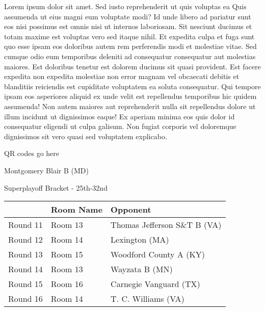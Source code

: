 \documentclass{article}%
\begin{document}
\vspace*{8pt}%
\linebreak%
\newline%
\newline%
    Lorem ipsum dolor sit amet. Sed iusto reprehenderit ut quis voluptas ea Quis assumenda ut eius magni eum voluptate modi? Id unde libero ad pariatur sunt eos nisi possimus est omnis nisi ut internos laboriosam. Sit nesciunt ducimus et totam maxime est voluptas vero sed itaque nihil. Et expedita culpa et fuga sunt quo esse ipsam eos doloribus autem rem perferendis modi et molestiae vitae.\newline%
\newline%
    Sed cumque odio eum temporibus deleniti ad consequatur consequatur aut molestias maiores. Est doloribus tenetur est dolorem ducimus sit quasi provident. Est facere expedita non expedita molestiae non error magnam vel obcaecati debitis et blanditiis reiciendis est cupiditate voluptatem ea soluta consequatur. Qui tempore ipsam eos asperiores aliquid ex unde velit est repellendus temporibus hic quidem assumenda!\newline%
\newline%
    Non autem maiores aut reprehenderit nulla sit repellendus dolore ut illum incidunt ut dignissimos eaque! Ex aperiam minima eos quis dolor id consequatur eligendi ut culpa galisum. Non fugiat corporis vel doloremque dignissimos sit vero quasi sed voluptatem explicabo.\newline%
\newline%
\vspace*{30pt}%
\begin{center}%
\begin{Huge}%
QR codes go here%
\end{Huge}%
\end{center}%
\newpage%
\begin{center}%
\begin{Huge}%
Montgomery Blair B (MD)%
\end{Huge}%
\vspace*{8pt}%
\linebreak%
\begin{Large}%
Superplayoff Bracket {-} 25th{-}32nd%
\end{Large}%
\end{center}%
%
\begin{tabularx}{\textwidth}{|c|Y|Y|}%
\hline%
&Room Name&Opponent\\%
\hline%
Round 11&Room 13&Thomas Jefferson S\&T B (VA)\\%
Round 12&Room 14&Lexington (MA)\\%
Round 13&Room 15&Woodford County A (KY)\\%
Round 14&Room 13&Wayzata B (MN)\\%
Round 15&Room 16&Carnegie Vanguard (TX)\\%
Round 16&Room 14&T. C. Williams (VA)\\%
\hline%
\end{tabularx}%
\end{document}
